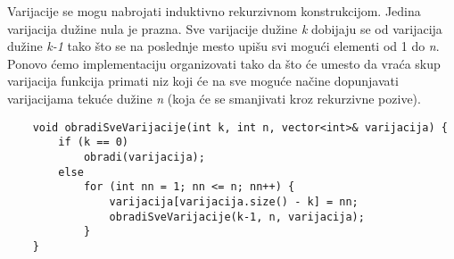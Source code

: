 \documentclass{article}
\begin{document}
\newline
Varijacije se mogu nabrojati induktivno rekurzivnom konstrukcijom. Jedina
varijacija dužine nula je prazna. Sve varijacije dužine \textit{k} dobijaju se od varijacija
dužine \textit{k-1} tako što se na poslednje mesto upišu svi mogući elementi od 1 do \textit{n}. Ponovo ćemo implementaciju organizovati tako da što će umesto da vraća
skup varijacija funkcija primati niz koji će na sve moguće načine dopunjavati
varijacijama tekuće dužine \textit{n} (koja će se smanjivati kroz rekurzivne pozive).
\begin{lstlisting}
    void obradiSveVarijacije(int k, int n, vector<int>& varijacija) {
        if (k == 0)
            obradi(varijacija);
        else
            for (int nn = 1; nn <= n; nn++) {
                varijacija[varijacija.size() - k] = nn;
                obradiSveVarijacije(k-1, n, varijacija);
            }
    }
\end{lstlisting}
\end{document}
